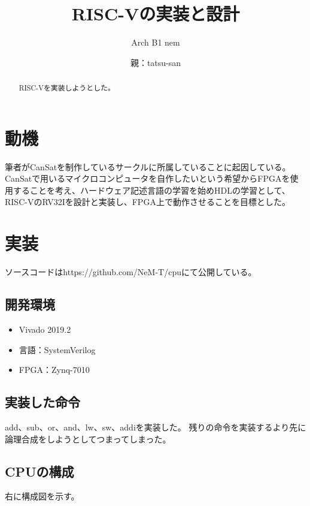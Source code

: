 \documentclass[a4j,10pt]{jsarticle}
\begin{document}
\title{
RISC-Vの実装と設計
}

\author{
Arch B1 nem
\and
親：tatsu-san
}

\pagestyle{empty}

\begin{abstract}
RISC-Vを実装しようとした。
\end{abstract}

\maketitle

\section{動機}
筆者がCanSatを制作しているサークルに所属していることに起因している。CanSatで用いるマイクロコンピュータを自作したいという希望からFPGAを使用することを考え、ハードウェア記述言語の学習を始めHDLの学習として、RISC-VのRV32Iを設計と実装し、FPGA上で動作させることを目標とした。

\section{実装}
ソースコードはhttps://github.com/NeM-T/cpuにて公開している。

\subsection{開発環境}
\begin{itemize}
\item Vivado 2019.2
\item 言語：SystemVerilog
\item FPGA：Zynq-7010
\end{itemize}

\subsection{実装した命令}
add、sub、or、and、lw、sw、addiを実装した。
残りの命令を実装するより先に論理合成をしようとしてつまってしまった。

\subsection{CPUの構成}
右に構成図を示す。
\end{document}
